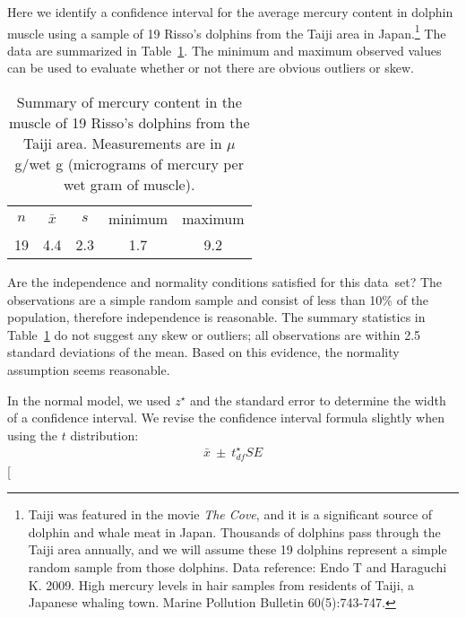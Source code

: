 Here we identify a confidence interval for the average mercury content in dolphin muscle using a sample of 19 Risso's dolphins from the Taiji area in Japan.\footnote{Taiji was featured in the movie \emph{The Cove}, and it is a significant source of dolphin and whale meat in Japan. Thousands of dolphins pass through the Taiji area annually, and we will assume these 19 dolphins represent a simple random sample from those dolphins. Data reference: Endo T and Haraguchi K. 2009. High mercury levels in hair samples from residents of Taiji, a Japanese whaling town. Marine Pollution Bulletin 60(5):743-747.} The data are summarized in Table~\ref{summaryStatsOfHgInMuscleOfRissosDolphins}. The minimum and maximum observed values can be used to evaluate whether or not there are obvious outliers or skew.

\begin{table}[h]
\centering
\begin{tabular}{ccc cc}
\hline
$n$ & $\bar{x}$ & $s$ & minimum & maximum \\
19   & 4.4	  & 2.3  & 1.7	       & 9.2 \\
\hline
\end{tabular}
\caption{Summary of mercury content in the muscle of 19 Risso's dolphins from the Taiji area. Measurements are in $\mu$g/wet g (micrograms of mercury per wet gram of muscle).}
\label{summaryStatsOfHgInMuscleOfRissosDolphins}
\end{table}

\begin{example}{Are the independence and normality conditions satisfied for this data~set?}
The observations are a simple random sample and consist of less than 10\% of the population, therefore independence is reasonable. The summary statistics in Table~\ref{summaryStatsOfHgInMuscleOfRissosDolphins} do not suggest any skew or outliers; all observations are within 2.5 standard deviations of the mean. Based on this evidence, the normality assumption seems reasonable.
\end{example}

In the normal model, we used $z^{\star}$ and the standard error to determine the width of a confidence interval. We revise the confidence interval formula slightly when using the $t$ distribution:
\begin{eqnarray*}
\bar{x} \ \pm\  t^{\star}_{df}SE
\end{eqnarray*}
\marginpar[\raggedright\vspace{-9mm}

